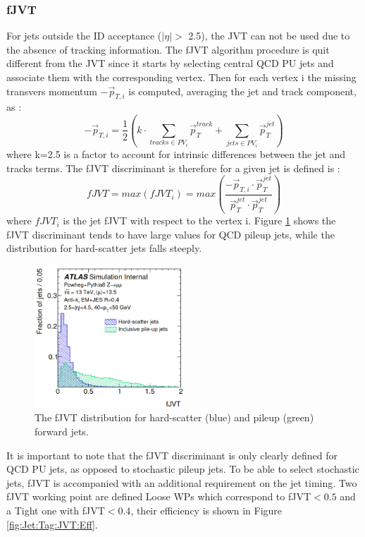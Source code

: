 \subsubsection{fJVT}
\label{Jet:Tag:JVT:fJVT}
For jets outside the ID acceptance ($|\eta|>$ 2.5), the JVT can not be used due to the absence of tracking information. The fJVT algorithm procedure is quit different from the JVT since it starts by selecting central QCD PU jets and associate them with the corresponding vertex. Then for each vertex i the missing transvers momentum $-\vec{p}_{T, i}$ is computed, averaging the jet and track component, as :
\begin{equation}
    -\vec{p}_{T, i}=\frac{1}{2}\left(k \cdot \sum_{tracks \in P V_{i}} \vec{p}_{T}^{track }+\sum_{jets \in PV_{i}} \vec{p}_{T}^{jet}\right)
\end{equation}
where k=2.5 is a factor to account for intrinsic differences between the jet and tracks terms. The fJVT discriminant is therefore for a given jet is defined is :
\begin{equation}
    fJVT = max(fJVT_i) = max(\frac{-\vec{p}_{T, i} \cdot \vec{p}_{T}^{j e t}}{\vec{p}_{T}^{j e t} \cdot \vec{p}_{T}^{j e t}})
\end{equation}
where $fJVT_i$ is the jet fJVT with respect to the vertex i. Figure \ref{fig:Jet:Tag:JVT:fJVT} shows the fJVT discriminant tends to have large values for QCD pileup jets, while the distribution for hard-scatter jets falls steeply.
\begin{figure}[H]
    \centering
    \includegraphics[width=0.5\textwidth]{Ch4/Img/fJVT.png}
    \caption{The fJVT distribution for hard-scatter (blue) and pileup (green) forward jets.}
    \label{fig:Jet:Tag:JVT:fJVT}
\end{figure}
It is important to note that the fJVT discriminant is only clearly defined for QCD PU jets, as opposed to stochastic pileup jets. To be able to select stochastic jets, fJVT is accompanied with an additional requirement on the jet timing. Two fJVT working point are defined Loose WPs which correspond to fJVT$<0.5$ and a Tight one with fJVT$<0.4$, their efficiency is shown in Figure \ref{fig:Jet:Tag:JVT:Eff}.
